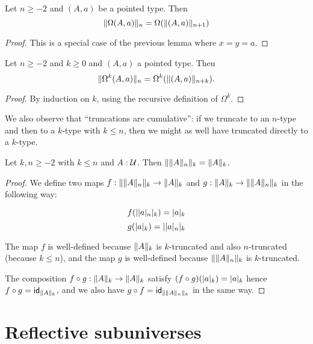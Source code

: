 \begin{cor}
  Let $n\ge-2$ and $(A,a)$ be a pointed type. Then
  \[\trunc n{\Omega(A,a)}=\Omega(\trunc{n+1}{(A,a)})\]
\end{cor}
\begin{proof}
  This is a special case of the previous lemma where $x=y=a$.
\end{proof}

\begin{cor}
  Let $n\ge -2$ and $k\ge 0$ and $(A,a)$ a pointed type.  Then
  \[\trunc n{\Omega^k(A,a)} = \Omega^k(\trunc{n+k}{(A,a)}). \]
\end{cor}
\begin{proof}
  By induction on $k$, using the recursive definition of $\Omega^k$.
\end{proof}

We also observe that ``truncations are cumulative'': if we truncate to an $n$-type and then to a $k$-type with $k\le n$, then we might as well have truncated directly to a $k$-type.

\begin{lem}
  Let $k,n\ge-2$ with $k\le{}n$ and $A:\type$. Then
  $\trunc k{\trunc nA}=\trunc kA$.
\end{lem}
\begin{proof}
  We define two maps $f:\trunc k{\trunc nA}\to\trunc kA$ and
  $g:\trunc kA\to\trunc k{\trunc nA}$ in the following way:

  \[f(\tproj k{\tproj na})=\tproj ka\]
  \[g(\tproj ka)=\tproj k{\tproj na}\]

  The map $f$ is well-defined because $\trunc kA$ is $k$-truncated and also
  $n$-truncated (because $k\le{}n$), and the map $g$ is well-defined because
  $\trunc k{\trunc nA}$ is $k$-truncated.

  The composition $f\circ{}g:\trunc kA\to\trunc kA$ satisfy
  $(f\circ{}g)(\tproj ka)=\tproj ka$ hence $f\circ{}g=\idfunc[\trunc kA]$, and
  we also have $g\circ{}f=\idfunc[\trunc k{\trunc nA}]$ in the same way.
\end{proof}



\section{Reflective subuniverses}
\label{subsec:reflective-subuniverses}

